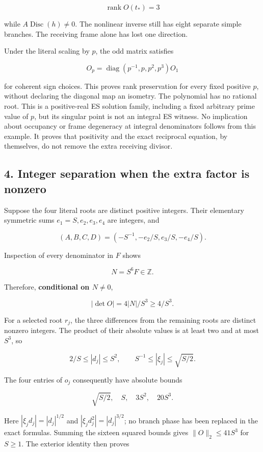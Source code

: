 \[
 \boxed{\operatorname{rank}O(t_*)=3}
\]

while \(A\operatorname{Disc}(h)\ne0\). The nonlinear inverse still has
eight separate simple branches. The receiving frame alone has lost one
direction.

Under the literal scaling by \(p\), the odd matrix satisfies

\[
 O_p=\operatorname{diag}(p^{-1},p,p^2,p^3)O_1
\]

for coherent sign choices. This proves rank preservation for every fixed
positive \(p\), without declaring the diagonal map an isometry. The
polynomial has no rational root. This is a positive-real ES solution
family, including a fixed arbitrary prime value of \(p\), but its
singular point is not an integral ES witness. No implication about
occupancy or frame degeneracy at integral denominators follows from this
example. It proves that positivity and the exact reciprocal equation, by
themselves, do not remove the extra receiving divisor.

\subsection{4. Integer separation when the extra factor is
nonzero}\label{integer-separation-when-the-extra-factor-is-nonzero}

Suppose the four literal roots are distinct positive integers. Their
elementary symmetric sums \(e_1=S,e_2,e_3,e_4\) are integers, and

\[
 (A,B,C,D)=(-S^{-1},-e_2/S,e_3/S,-e_4/S).
\]

Inspection of every denominator in \(F\) shows

\[
 N=S^6F\in\mathbb Z.
\]

Therefore, \textbf{conditional on \(N\ne0\)},

\[
 \boxed{|\det O|=4|N|/S^3\ge4/S^3.}
\]

For a selected root \(r_j\), the three differences from the remaining
roots are distinct nonzero integers. The product of their absolute
values is at least two and at most \(S^3\), so

\[
 2/S\le|d_j|\le S^2,\qquad S^{-1}\le|\xi_j|\le\sqrt{S/2}.
\]

The four entries of \(o_j\) consequently have absolute bounds

\[
 \sqrt{S/2},\quad S,\quad3S^2,\quad20S^3.
\]

Here \(|\xi_jd_j|=|d_j|^{1/2}\) and \(|\xi_jd_j^2|=|d_j|^{3/2}\); no
branch phase has been replaced in the exact formulas. Summing the
sixteen squared bounds gives \(\|O\|_2\le41S^3\) for \(S\ge1\). The
exterior identity then proves


